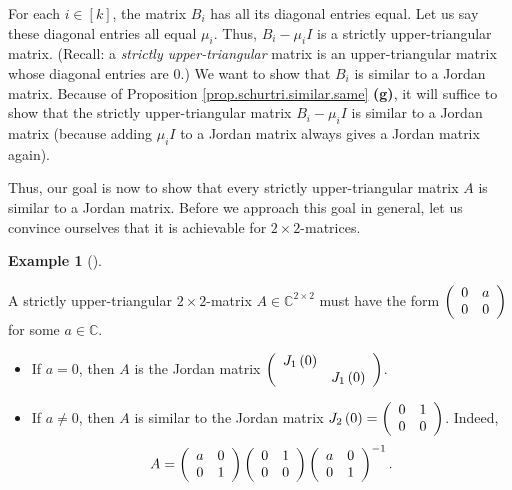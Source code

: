 \documentclass[numbers=enddot,12pt,final,onecolumn,notitlepage]{scrartcl}%
\numberwithin{exer}{subsection}
\theoremstyle{definition}
\newtheorem{exam}[theo]{Example}
\newenvironment{example}[1][]
{\begin{exam}[#1]\begin{leftbar}}
{\end{leftbar}\end{exam}}
\begin{document}
For each $i\in\left[  k\right]  $, the matrix $B_{i}$ has all its diagonal
entries equal. Let us say these diagonal entries all equal $\mu_{i}$. Thus,
$B_{i}-\mu_{i}I$ is a strictly upper-triangular matrix. (Recall: a
\emph{strictly upper-triangular} matrix is an upper-triangular matrix whose
diagonal entries are $0$.) We want to show that $B_{i}$ is similar to a Jordan
matrix. Because of Proposition \ref{prop.schurtri.similar.same} \textbf{(g)},
it will suffice to show that the strictly upper-triangular matrix $B_{i}%
-\mu_{i}I$ is similar to a Jordan matrix (because adding $\mu_{i}I$ to a
Jordan matrix always gives a Jordan matrix again).

Thus, our goal is now to show that every strictly upper-triangular matrix $A$
is similar to a Jordan matrix. Before we approach this goal in general, let us
convince ourselves that it is achievable for $2\times2$-matrices.

\begin{example}
A strictly upper-triangular $2\times2$-matrix $A\in\mathbb{C}^{2\times2}$ must
have the form $\left(
\begin{array}
[c]{cc}%
0 & a\\
0 & 0
\end{array}
\right)  $ for some $a\in\mathbb{C}$.

\begin{itemize}
\item If $a=0$, then $A$ is the Jordan matrix $\left(
\begin{array}
[c]{cc}%
J_{1}\left(  0\right)  & \\
& J_{1}\left(  0\right)
\end{array}
\right)  $.

\item If $a\neq0$, then $A$ is similar to the Jordan matrix $J_{2}\left(
0\right)  =\left(
\begin{array}
[c]{cc}%
0 & 1\\
0 & 0
\end{array}
\right)  $. Indeed,
\[
A=\left(
\begin{array}
[c]{cc}%
a & 0\\
0 & 1
\end{array}
\right)  \left(
\begin{array}
[c]{cc}%
0 & 1\\
0 & 0
\end{array}
\right)  \left(
\begin{array}
[c]{cc}%
a & 0\\
0 & 1
\end{array}
\right)  ^{-1}.
\]

\end{itemize}
\end{example}
\end{document}
